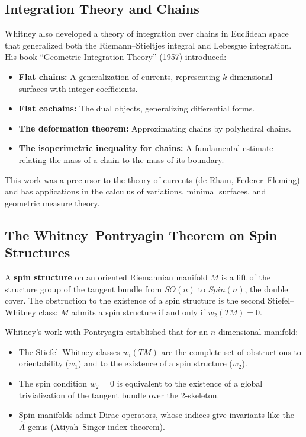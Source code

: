\subsection{Integration Theory and Chains}

Whitney also developed a theory of integration over chains in Euclidean space that generalized both the Riemann--Stieltjes integral and Lebesgue integration. His book ``Geometric Integration Theory'' (1957) introduced:
\begin{itemize}
    \item \textbf{Flat chains:} A generalization of currents, representing $k$-dimensional surfaces with integer coefficients.
    \item \textbf{Flat cochains:} The dual objects, generalizing differential forms.
    \item \textbf{The deformation theorem:} Approximating chains by polyhedral chains.
    \item \textbf{The isoperimetric inequality for chains:} A fundamental estimate relating the mass of a chain to the mass of its boundary.
\end{itemize}

This work was a precursor to the theory of currents (de Rham, Federer--Fleming) and has applications in the calculus of variations, minimal surfaces, and geometric measure theory.

\subsection{The Whitney--Pontryagin Theorem on Spin Structures}

A \textbf{spin structure} on an oriented Riemannian manifold $M$ is a lift of the structure group of the tangent bundle from $SO(n)$ to $Spin(n)$, the double cover. The obstruction to the existence of a spin structure is the second Stiefel--Whitney class: $M$ admits a spin structure if and only if $w_2(TM) = 0$.

Whitney's work with Pontryagin established that for an $n$-dimensional manifold:
\begin{itemize}
    \item The Stiefel--Whitney classes $w_i(TM)$ are the complete set of obstructions to orientability ($w_1$) and to the existence of a spin structure ($w_2$).
    \item The spin condition $w_2 = 0$ is equivalent to the existence of a global trivialization of the tangent bundle over the 2-skeleton.
    \item Spin manifolds admit Dirac operators, whose indices give invariants like the $\hat A$-genus (Atiyah--Singer index theorem).
\end{itemize}

